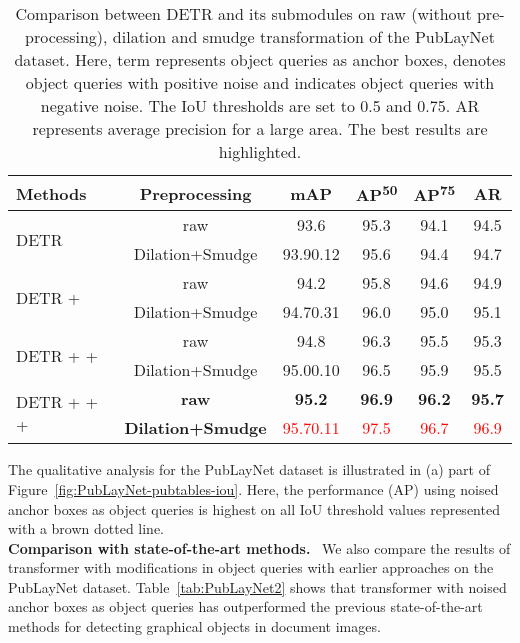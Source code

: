 \documentclass[sn-mathphys]{sn-jnl}\jyear{2021}\theoremstyle{thmstyleone}\newtheorem{theorem}{Theorem}\newtheorem{proposition}[theorem]{Proposition}\theoremstyle{thmstyletwo}\newtheorem{example}{Example}\newtheorem{remark}{Remark}\theoremstyle{thmstylethree}\newtheorem{definition}{Definition}\usepackage{amsmath}
\begin{document}
\begin{table*}[h!]
\tiny
\begin{center}
\caption{Comparison between DETR and its submodules on raw
(without pre-processing), dilation and smudge transformation of the PubLayNet dataset. Here, term  represents object queries as anchor boxes,  denotes object queries with positive noise and  indicates object queries with negative noise. The IoU thresholds are set to 0.5 and 0.75. AR represents average precision for a large area. The best results are highlighted.}\label{tab:PubLayNet1}
\begin{tabular*}{\textwidth}{@{\extracolsep{\fill}}lccccc@{\extracolsep{\fill}}}
\toprule
\textbf{Methods} & \textbf{Preprocessing} &
\textbf{mAP} & 
\textbf{AP\textsuperscript{50}} &
\textbf{AP\textsuperscript{75}} & \textbf{AR} \\
\midrule
\multirow{2}{*}{DETR} & raw & 93.6 & 95.3 & 94.1 & 94.5\\
& Dilation+Smudge & 93.90.12 & 95.6 & 94.4  & 94.7\\
\midrule

\multirow{2}{*}{DETR + } & raw & 94.2 & 95.8 & 94.6 & 94.9\\
& Dilation+Smudge & 94.70.31 & 96.0 & 95.0  & 95.1\\
\midrule

\multirow{2}{*}{DETR +  + } & raw & 94.8 & 96.3 & 95.5 & 95.3 \\
& Dilation+Smudge & 95.00.10 & 96.5 & 95.9  & 95.5\\
\midrule

\multirow{2}{*}{DETR +  +  + } & \textbf{raw} & \textbf{95.2} & \textbf{96.9} & \textbf{96.2} & \textbf{95.7}\\
& \textbf{Dilation+Smudge} & \textcolor{red}{95.70.11} & \textcolor{red}{97.5} & \textcolor{red}{96.7} & \textcolor{red}{96.9}\\
\bottomrule
\end{tabular*}
\end{center}
\end{table*} 
The qualitative analysis for the PubLayNet dataset is illustrated in (a) part of Figure~\ref{fig:PubLayNet-pubtables-iou}. Here, the performance (AP) using noised anchor boxes as object queries is highest on all IoU threshold values represented with a brown dotted line. \\
\noindent\textbf{Comparison with state-of-the-art methods.}~
We also compare the results of transformer with modifications in object queries with earlier approaches on the PubLayNet dataset. Table~\ref{tab:PubLayNet2} shows that transformer with noised anchor boxes as object queries has outperformed the previous state-of-the-art methods for detecting graphical objects in document images.\\
\end{document}
